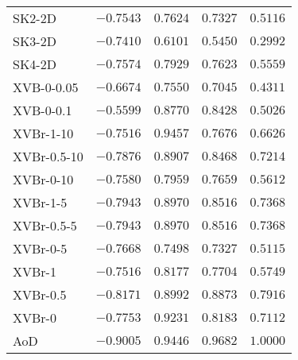 \begin{longtable}[ht]{lrcrr}
SK2-2D&$-0.7543$&$0.7624$&$0.7327$&$0.5116$\\
SK3-2D&$-0.7410$&$0.6101$&$0.5450$&$0.2992$\\
SK4-2D&$-0.7574$&$0.7929$&$0.7623$&$0.5559$\\
XVB-0-0.05&$-0.6674$&$0.7550$&$0.7045$&$0.4311$\\
XVB-0-0.1&$-0.5599$&$0.8770$&$0.8428$&$0.5026$\\
XVBr-1-10&$-0.7516$&$0.9457$&$0.7676$&$0.6626$\\
XVBr-0.5-10&$-0.7876$&$0.8907$&$0.8468$&$0.7214$\\
XVBr-0-10&$-0.7580$&$0.7959$&$0.7659$&$0.5612$\\
XVBr-1-5&$-0.7943$&$0.8970$&$0.8516$&$0.7368$\\
XVBr-0.5-5&$-0.7943$&$0.8970$&$0.8516$&$0.7368$\\
XVBr-0-5&$-0.7668$&$0.7498$&$0.7327$&$0.5115$\\
XVBr-1&$-0.7516$&$0.8177$&$0.7704$&$0.5749$\\
XVBr-0.5&$-0.8171$&$0.8992$&$0.8873$&$0.7916$\\
XVBr-0&$-0.7753$&$0.9231$&$0.8183$&$0.7112$\\
AoD&$-0.9005$&$0.9446$&$0.9682$&$1.0000$\\
\end{longtable}

